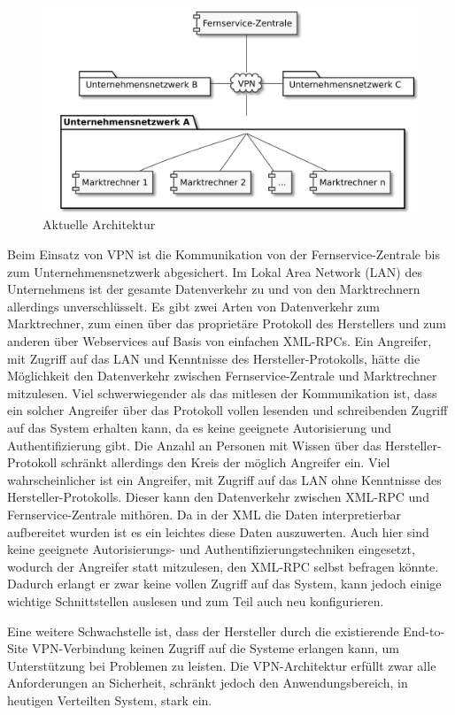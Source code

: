 \documentclass[11pt,a4paper]{report}
\begin{document}
\begin{figure}[htbp]
\centering
\includegraphics[scale=0.2]{images/problemfeld.pdf}
\caption{Aktuelle Architektur}
\label{fig:current_setup}
\end{figure}

Beim Einsatz von VPN ist die Kommunikation von der Fernservice-Zentrale bis zum Unternehmensnetzwerk abgesichert. Im Lokal Area Network (LAN) des Unternehmens ist der gesamte Datenverkehr zu und von den Marktrechnern allerdings unverschlüsselt. Es gibt zwei Arten von Datenverkehr zum Marktrechner, zum einen über das proprietäre Protokoll des Herstellers und zum anderen über Webservices auf Basis von einfachen XML-RPCs. Ein Angreifer, mit Zugriff auf das LAN und Kenntnisse des Hersteller-Protokolls, hätte die Möglichkeit den Datenverkehr zwischen Fernservice-Zentrale und Marktrechner mitzulesen. Viel schwerwiegender als das mitlesen der Kommunikation ist, dass ein solcher Angreifer über das Protokoll vollen lesenden und schreibenden Zugriff auf das System erhalten kann, da es keine geeignete Autorisierung und Authentifizierung gibt. Die Anzahl an Personen mit Wissen über das Hersteller-Protokoll schränkt allerdings den Kreis der möglich Angreifer ein. Viel wahrscheinlicher ist ein Angreifer, mit Zugriff auf das LAN ohne Kenntnisse des Hersteller-Protokolls. Dieser kann den Datenverkehr zwischen XML-RPC und Fernservice-Zentrale mithören. Da in der XML die Daten interpretierbar aufbereitet wurden ist es ein leichtes diese Daten auszuwerten. Auch hier sind keine geeignete Autorisierungs- und Authentifizierungstechniken eingesetzt, wodurch der Angreifer statt mitzulesen, den XML-RPC selbst befragen könnte. Dadurch erlangt er zwar keine vollen Zugriff auf das System, kann jedoch einige wichtige Schnittstellen auslesen und zum Teil auch neu konfigurieren. 

Eine weitere Schwachstelle ist, dass der Hersteller durch die existierende End-to-Site VPN-Verbindung keinen Zugriff auf die Systeme erlangen kann, um Unterstützung bei Problemen zu leisten. Die VPN-Architektur erfüllt zwar alle Anforderungen an Sicherheit, schränkt jedoch den Anwendungsbereich, in heutigen Verteilten System, stark ein.
\end{document}
